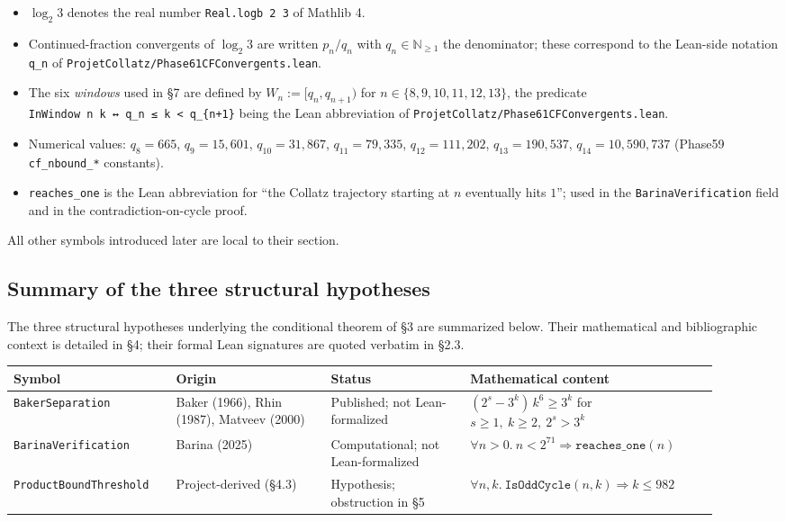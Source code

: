 \documentclass[
  11pt]{amsart}
\providecommand{\tightlist}{%
  \setlength{\itemsep}{0pt}\setlength{\parskip}{0pt}}
\theoremstyle{plain}
\theoremstyle{definition}
\theoremstyle{remark}
\begin{document}
\begin{itemize}
\tightlist
\item
  \(\log_2 3\) denotes the real number \texttt{Real.logb\ 2\ 3} of
  Mathlib 4.
\item
  Continued-fraction convergents of \(\log_2 3\) are written
  \(p_n / q_n\) with \(q_n \in \mathbb{N}_{\geq 1}\) the denominator;
  these correspond to the Lean-side notation \texttt{q\_n} of
  \texttt{ProjetCollatz/Phase61CFConvergents.lean}.
\item
  The six \emph{windows} used in §7 are defined by
  \(W_n := [q_n, q_{n+1})\) for \(n \in \{8, 9, 10, 11, 12, 13\}\), the
  predicate
  \texttt{InWindow\ n\ k\ ↔\ q\_n\ ≤\ k\ \textless{}\ q\_\{n+1\}} being
  the Lean abbreviation of
  \texttt{ProjetCollatz/Phase61CFConvergents.lean}.
\item
  Numerical values: \(q_8 = 665\), \(q_9 = 15{,}601\),
  \(q_{10} = 31{,}867\), \(q_{11} = 79{,}335\), \(q_{12} = 111{,}202\),
  \(q_{13} = 190{,}537\), \(q_{14} = 10{,}590{,}737\) (Phase59
  \texttt{cf\_nbound\_*} constants).
\item
  \texttt{reaches\_one} is the Lean abbreviation for ``the Collatz
  trajectory starting at \(n\) eventually hits \(1\)''; used in the
  \texttt{BarinaVerification} field and in the contradiction-on-cycle
  proof.
\end{itemize}

All other symbols introduced later are local to their section.

\subsection{Summary of the three structural
hypotheses}\label{summary-of-the-three-structural-hypotheses}

The three structural hypotheses underlying the conditional theorem of §3
are summarized below. Their mathematical and bibliographic context is
detailed in §4; their formal Lean signatures are quoted verbatim in
§2.3.

{\small
\begin{tabular}{@{}p{0.21\linewidth}p{0.20\linewidth}p{0.18\linewidth}p{0.32\linewidth}@{}}
\toprule
\textbf{Symbol} & \textbf{Origin} & \textbf{Status} & \textbf{Mathematical content} \\
\midrule
\texttt{BakerSeparation} &
Baker (1966), Rhin (1987), Matveev (2000) &
Published; not Lean-formalized &
$(2^s - 3^k)\, k^6 \geq 3^k$ for $s \geq 1,\ k \geq 2,\ 2^s > 3^k$ \\
\addlinespace
\texttt{BarinaVerification} &
Barina (2025) &
Computational; not Lean-formalized &
$\forall n > 0.\ n < 2^{71} \Rightarrow \mathtt{reaches\_one}(n)$ \\
\addlinespace
\texttt{ProductBoundThreshold} &
Project-derived (§4.3) &
Hypothesis; obstruction in §5 &
$\forall n, k.\ \mathtt{IsOddCycle}(n, k) \Rightarrow k \leq 982$ \\
\bottomrule
\end{tabular}}
\end{document}
